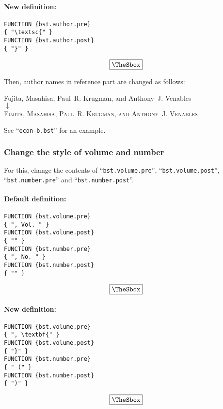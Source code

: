 \documentclass[10pt]{article}
\newenvironment{Frame}%
{\setlength{\fboxsep}{15pt}
\setlength{\mylength}{\linewidth}%
\addtolength{\mylength}{-2\fboxsep}%
\addtolength{\mylength}{-2\fboxrule}%
\Sbox
\minipage{\mylength}%
\setlength{\abovedisplayskip}{0pt}%
\setlength{\belowdisplayskip}{0pt}%
}%
{\endminipage\endSbox
\[\fbox{\TheSbox}\]}
\begin{document}
\paragraph{New definition:}
\begin{Frame}
\begin{verbatim}
FUNCTION {bst.author.pre}
{ "\textsc{" }
FUNCTION {bst.author.post}
{ "}" }
\end{verbatim}
\end{Frame}

Then, author names in reference part are changed as follows:
\begin{center}
Fujita, Masahisa, Paul~R. Krugman, and Anthony~J. Venables \\
 $\downarrow$ \\
\textsc{Fujita, Masahisa, Paul~R. Krugman, and Anthony~J. Venables}
\end{center}

See ``\texttt{econ-b.bst}'' for an example.

\subsubsection{Change the style of volume and number}

For this, change the contents of ``\texttt{bst.volume.pre}'',
``\texttt{bst.volume.post}'', ``\texttt{bst.number.pre}'' and
``\texttt{bst.number.post}''.  

\paragraph{Default definition:}
\begin{Frame}
\begin{verbatim}
FUNCTION {bst.volume.pre}
{ ", Vol. " }
FUNCTION {bst.volume.post}
{ "" }
FUNCTION {bst.number.pre}
{ ", No. " }
FUNCTION {bst.number.post}
{ "" }
\end{verbatim}
\end{Frame}

\paragraph{New definition:}
\begin{Frame}
 \begin{verbatim}
FUNCTION {bst.volume.pre}
{ ", \textbf{" }
FUNCTION {bst.volume.post}
{ "}" }
FUNCTION {bst.number.pre}
{ " (" }
FUNCTION {bst.number.post}
{ ")" }
\end{verbatim}
\end{Frame}
\end{document}

